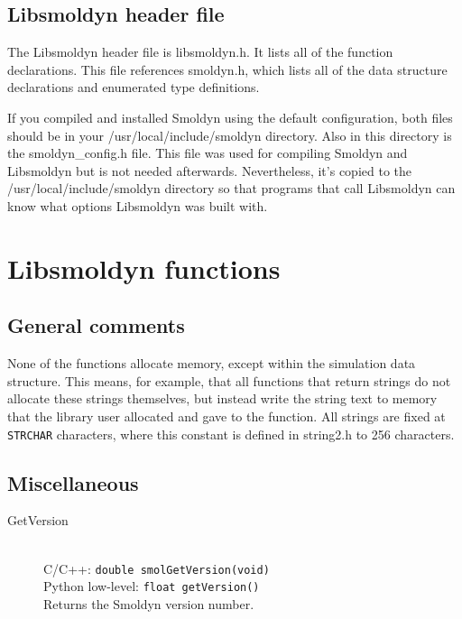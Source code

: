 \documentclass {book}
\newcommand {\ttt} {\texttt}
\begin{document}
\section{Libsmoldyn header file}

The Libsmoldyn header file is libsmoldyn.h. It lists all of the function declarations. This file references smoldyn.h, which lists all of the data structure declarations and enumerated type definitions.

If you compiled and installed Smoldyn using the default configuration, both files should be in your /usr/local/include/smoldyn directory. Also in this directory is the smoldyn\_config.h file. This file was used for compiling Smoldyn and Libsmoldyn but is not needed afterwards. Nevertheless, it's copied to the /usr/local/include/smoldyn directory so that programs that call Libsmoldyn can know what options Libsmoldyn was built with.


\chapter{Libsmoldyn functions}

\section{General comments}

None of the functions allocate memory, except within the simulation data structure. This means, for example, that all functions that return strings do not allocate these strings themselves, but instead write the string text to memory that the library user allocated and gave to the function.
All strings are fixed at \ttt{STRCHAR} characters, where this constant is defined in string2.h to 256 characters.

\section{Miscellaneous}

\begin{description}

\item[GetVersion]
\hfill \\
C/C++: \ttt{double smolGetVersion(void)}\\
Python low-level: \ttt{float getVersion()}\\
Returns the Smoldyn version number.

\end{description}
\end{document}
